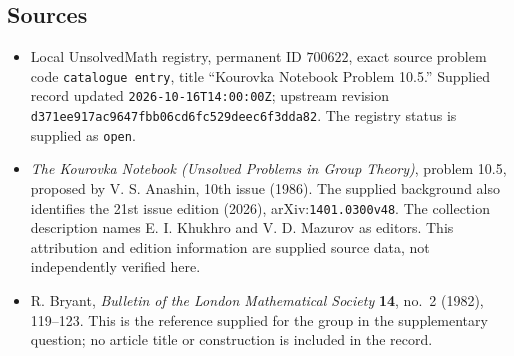 \documentclass[11pt]{article}
\begin{document}
\subsection{Sources}
\begin{itemize}
\item Local UnsolvedMath registry, permanent ID \(700622\), exact source problem code \texttt{catalogue entry}, title ``Kourovka Notebook Problem 10.5.'' Supplied record updated \texttt{2026-10-16T14:00:00Z}; upstream revision \texttt{d371ee917ac9647fbb06cd6fc529deec6f3dda82}. The registry status is supplied as \texttt{open}.
\item \emph{The Kourovka Notebook (Unsolved Problems in Group Theory)}, problem 10.5, proposed by V. S. Anashin, 10th issue (1986). The supplied background also identifies the 21st issue edition (2026), arXiv:\texttt{1401.0300v48}. The collection description names E. I. Khukhro and V. D. Mazurov as editors. This attribution and edition information are supplied source data, not independently verified here.
\item R. Bryant, \emph{Bulletin of the London Mathematical Society} \textbf{14}, no.~2 (1982), 119--123. This is the reference supplied for the group in the supplementary question; no article title or construction is included in the record.
\end{itemize}
\end{document}
